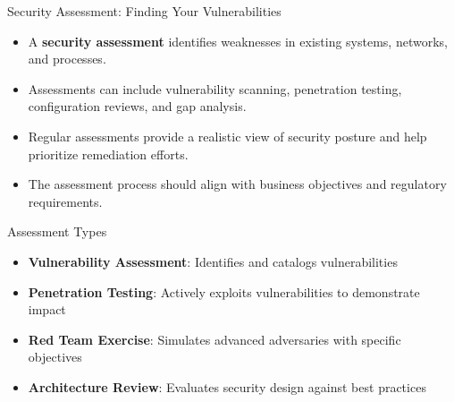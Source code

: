 \documentclass{beamer}
\begin{document}
\begin{frame}{Security Assessment: Finding Your Vulnerabilities}
\begin{itemize}
    \item A \textbf{security assessment} identifies weaknesses in existing systems, networks, and processes.
    \item Assessments can include vulnerability scanning, penetration testing, configuration reviews, and gap analysis.
    \item Regular assessments provide a realistic view of security posture and help prioritize remediation efforts.
    \item The assessment process should align with business objectives and regulatory requirements.
\end{itemize}

\begin{exampleblock}{Assessment Types}
\begin{itemize}
    \item \textbf{Vulnerability Assessment}: Identifies and catalogs vulnerabilities
    \item \textbf{Penetration Testing}: Actively exploits vulnerabilities to demonstrate impact
    \item \textbf{Red Team Exercise}: Simulates advanced adversaries with specific objectives
    \item \textbf{Architecture Review}: Evaluates security design against best practices
\end{itemize}
\end{exampleblock}
\end{frame}
\end{document}
